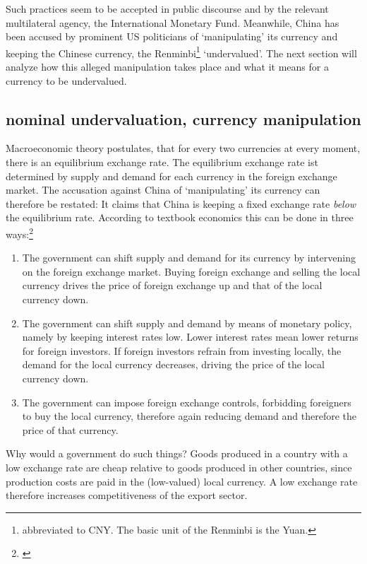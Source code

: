 \documentclass[11pt]{article}
\begin{document}
Such practices seem to be accepted in public discourse and by the relevant multilateral agency, the International Monetary Fund. Meanwhile, China has been accused by prominent US politicians of `manipulating' its currency and keeping the Chinese currency, the Renminbi\footnote{abbreviated to CNY. The basic unit of the Renminbi is the Yuan.} `undervalued'. The next section will analyze how this alleged manipulation takes place and what it means for a currency to be undervalued. 

\subsection{nominal undervaluation, currency manipulation}

Macroeconomic theory postulates, that for every two currencies at every moment, there is an equilibrium exchange rate. The equilibrium exchange rate ist determined by supply and demand for each currency in the foreign exchange market. The accusation against China of `manipulating' its currency can therefore be restated: It claims that China is keeping a fixed exchange rate \emph{below} the equilibrium rate. According to textbook economics this can be done in three ways:\footnote{\cite[pp. 514]{Krugman2008}}

\begin{enumerate}
\item{The government can shift supply and demand for its currency by intervening on the foreign exchange market. Buying foreign exchange and selling the local currency drives the price of foreign exchange up and that of the local currency down.}
\item{The government can shift supply and demand by means of monetary policy, namely by keeping interest rates low. Lower interest rates mean lower returns for foreign investors. If foreign investors refrain from investing locally, the demand for the local currency decreases, driving the price of the local currency down.}
\item{The government can impose foreign exchange controls, forbidding foreigners to buy the local currency, therefore again reducing demand and therefore the price of that currency.}
\end{enumerate}

Why would a government do such things? Goods produced in a country with a low exchange rate are cheap relative to goods produced in other countries, since production costs are paid in the (low-valued) local currency. A low exchange rate therefore increases competitiveness of the export sector. 
\end{document}
